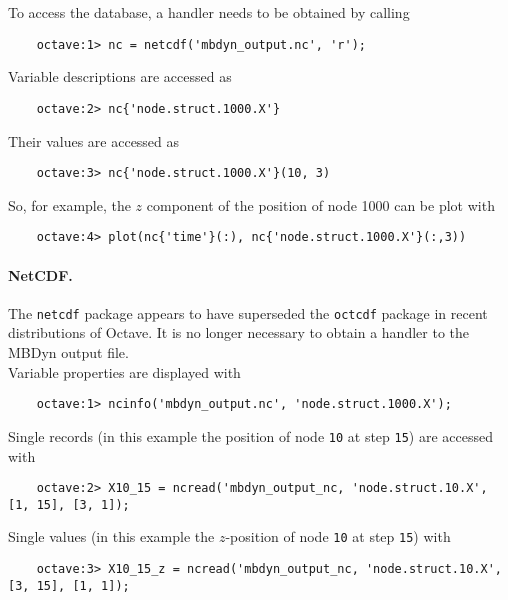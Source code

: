 To access the database, a handler needs to be obtained by calling
\begin{verbatim}
    octave:1> nc = netcdf('mbdyn_output.nc', 'r');
\end{verbatim}
Variable descriptions are accessed as
\begin{verbatim}
    octave:2> nc{'node.struct.1000.X'}
\end{verbatim}
Their values are accessed as
\begin{verbatim}
    octave:3> nc{'node.struct.1000.X'}(10, 3)
\end{verbatim}
So, for example, the $z$ component of the position of node 1000 can be plot with 
\begin{verbatim}
    octave:4> plot(nc{'time'}(:), nc{'node.struct.1000.X'}(:,3))
\end{verbatim}

\paragraph{NetCDF.}
The \texttt{netcdf} package appears to have superseded the \texttt{octcdf} package in recent
distributions of Octave. It is no longer necessary to obtain a handler to the MBDyn output file. \\

Variable properties are displayed with
\begin{verbatim}
    octave:1> ncinfo('mbdyn_output.nc', 'node.struct.1000.X');
\end{verbatim}
Single records (in this example the position of node \texttt{10} at step \texttt{15})
are accessed with
\begin{verbatim}
    octave:2> X10_15 = ncread('mbdyn_output_nc, 'node.struct.10.X', [1, 15], [3, 1]);
\end{verbatim}
Single values (in this example the $z$-position of node \texttt{10} at step \texttt{15}) 
with
\begin{verbatim}
    octave:3> X10_15_z = ncread('mbdyn_output_nc, 'node.struct.10.X', [3, 15], [1, 1]);
\end{verbatim}
